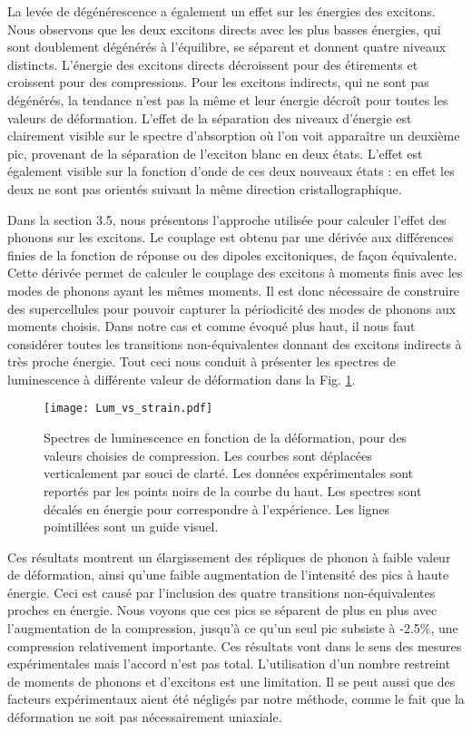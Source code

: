 La levée de dégénérescence a également un effet sur les énergies des excitons. Nous observons que les deux excitons directs avec les plus basses énergies, qui sont doublement dégénérés à l'équilibre, se séparent et donnent quatre niveaux distincts. L'énergie des excitons directs décroissent pour des étirements et croissent pour des compressions. Pour les excitons indirects, qui ne sont pas dégénérés, la tendance n'est pas la même et leur énergie décroît pour toutes les valeurs de déformation. L'effet de la séparation des niveaux d'énergie est clairement visible sur le spectre d'absorption où l'on voit apparaître un deuxième pic, provenant de la séparation de l'exciton blanc en deux états. L'effet est également visible sur la fonction d'onde de ces deux nouveaux états : en effet les deux ne sont pas orientés suivant la même direction cristallographique.

Dans la section 3.5, nous présentons l'approche utilisée pour calculer l'effet des phonons sur les excitons. Le couplage est obtenu par une dérivée aux différences finies de la fonction de réponse ou des dipoles excitoniques, de façon équivalente. Cette dérivée permet de calculer le couplage des excitons à moments finis avec les modes de phonons ayant les mêmes moments. Il est donc nécessaire de construire des supercellules pour pouvoir capturer la périodicité des modes de phonons aux moments choisis. Dans notre cas et comme évoqué plus haut, il nous faut considérer toutes les transitions non-équivalentes donnant des excitons indirects à très proche énergie. Tout ceci nous conduit à présenter les spectres de luminescence à différente valeur de déformation dans la Fig. \ref{fig:Lum_vs_strain_fr}.
\begin{figure}[h!t]
	\vspace{0.2cm}
	\setcapindent{2em}
	\centering
	\texttt{[image: Lum\_vs\_strain.pdf]}
	\caption{Spectres de luminescence en fonction de la déformation, pour des valeurs choisies de compression. Les courbes sont déplacées verticalement par souci de clarté. Les données expérimentales sont reportés par les points noirs de la courbe du haut. Les spectres sont décalés en énergie pour correspondre à l'expérience. Les lignes pointillées sont un guide visuel.}
	\label{fig:Lum_vs_strain_fr}
\end{figure}

Ces résultats montrent un élargissement des répliques de phonon à faible valeur de déformation, ainsi qu'une faible augmentation de l'intensité des pics à haute énergie. Ceci est causé par l'inclusion des quatre transitions non-équivalentes proches en énergie. Nous voyons que ces pics se séparent de plus en plus avec l'augmentation de la compression, jusqu'à ce qu'un seul pic subsiste à -2.5\%, une compression relativement importante. Ces résultats vont dans le sens des mesures expérimentales mais l'accord n'est pas total. L'utilisation d'un nombre restreint de moments de phonons et d'excitons est une limitation. Il se peut aussi que des facteurs expérimentaux aient été négligés par notre méthode, comme le fait que la déformation ne soit pas nécessairement uniaxiale.\\


